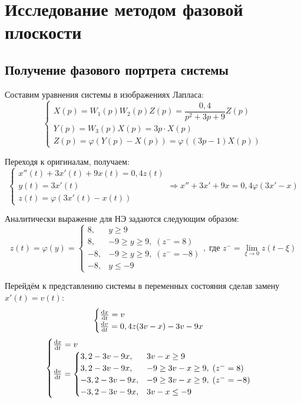 	\section[Метод фазовой плоскости]{Исследование методом фазовой плоскости}
	\subsection{Получение фазового портрета системы}
	
	Составим уравнения системы в изображениях Лапласа:
	\begin{equation*}
		\begin{cases}
			X(p) = W_1(p)W_2(p)Z(p) = \dfrac{0,4}{p^2+3p+9}Z(p) \\
			Y(p) = W_3(p)X(p) = 3p\cdot X(p) \\
			Z(p) = \varphi(Y(p)-X(p)) = \varphi((3p-1)X(p))
		\end{cases}	
	\end{equation*}
	
	Переходя к оригиналам, получаем:
	\begin{equation}
		\begin{cases}
			x''(t) + 3x'(t) + 9x(t) = 0,4z(t) \\
			y(t) = 3x'(t) \\
			z(t) = \varphi(3x'(t) - x(t))
		\end{cases} \Rightarrow x''+3x'+9x = 0,4\varphi(3x'-x)
		\label{sys_equation}
	\end{equation}

	Аналитически выражение для НЭ задаются следующим образом:
	\begin{equation*}
		z(t) = \varphi(y) = \begin{cases}
			8, &y\geq 9 \\
			8, &-9\geq y \geq 9,\;(z^{-} = 8) \\
			-8, &-9 \geq y \geq 9,\;(z^{-}=-8) \\ 
			-8, &y \leq -9
		\end{cases},\;\text{где } z^{-} = \lim_{\xi\to 0}z(t-\xi)
	\end{equation*}
	
	Перейдём к представлению системы в переменных состояния сделав замену $x'(t) = v(t)$:
	\begin{equation*}
		\begin{cases}
			\dv{x}{t} = v \\
			\dv{v}{t} = 0,4z(3v-x) - 3v - 9x
		\end{cases}
	\end{equation*}
	\begin{equation}
		\begin{cases}
			\dv{x}{t} = v \\
			\dv{v}{t} = \begin{cases}
				3,2-3v-9x, &3v-x\geq 9 \\
				3,2-3v-9x, &-9\geq 3v-x \geq 9,\;(z^{-} = 8) \\
				-3,2-3v-9x, &-9 \geq 3v-x \geq 9,\;(z^{-} = -8) \\ 
				-3,2-3v-9x, &3v-x \leq -9
			\end{cases}
		\end{cases}
		\label{sys_equations}
	\end{equation}
	
